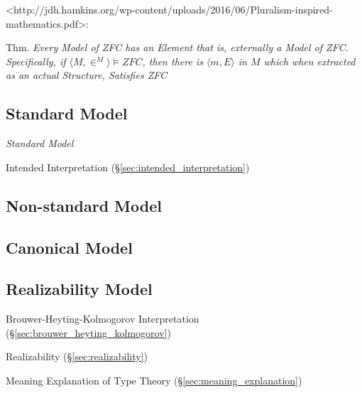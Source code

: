 <http://jdh.hamkins.org/wp-content/uploads/2016/06/Pluralism-inspired-mathematics.pdf>:

Thm. \emph{Every Model of ZFC has an Element that is, externally a
  Model of ZFC. Specifically, if $\langle{M,\in^M}\rangle \vDash ZFC$,
then there is $\langle{m,E}\rangle$ in $M$ which when extracted as an
actual Structure, Satisfies ZFC}



\subsection{Standard Model}\label{sec:standard_model}

\emph{Standard Model}

Intended Interpretation (\S\ref{sec:intended_interpretation})



\subsection{Non-standard Model}\label{sec:nonstandard_model}

\subsection{Canonical Model}\label{sec:canonical_model}

\subsection{Realizability Model}\label{sec:realizability_model}

Brouwer-Heyting-Kolmogorov Interpretation
(\S\ref{sec:brouwer_heyting_kolmogorov})

Realizability (\S\ref{sec:realizability})

Meaning Explanation of Type Theory (\S\ref{sec:meaning_explanation})

